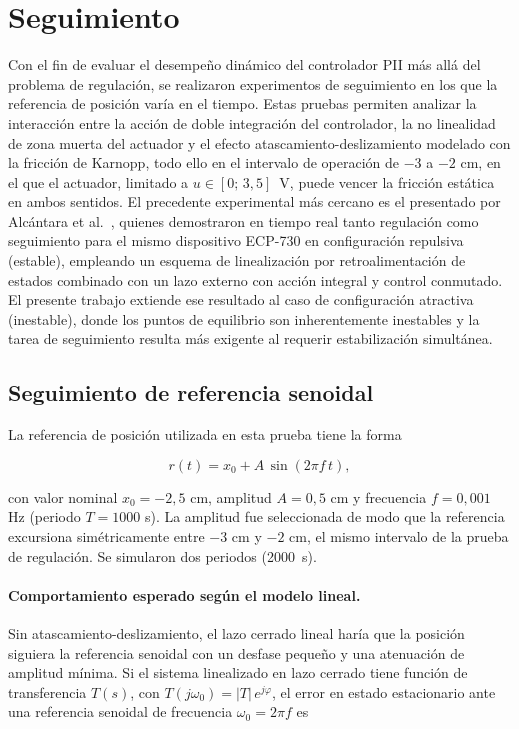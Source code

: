 \section{Seguimiento}

Con el fin de evaluar el desempeño dinámico del controlador PII más allá del problema de regulación,
se realizaron experimentos de seguimiento en los que la referencia de posición varía en el tiempo.
Estas pruebas permiten analizar la interacción entre la acción de doble integración del controlador,
la no linealidad de zona muerta del actuador y el efecto atascamiento-deslizamiento modelado con
la fricción de Karnopp, todo ello en el intervalo de operación de $-3$ a $-2$ cm, en el que el actuador, limitado a $u\in[0;\,3{,}5]$~V, puede vencer la fricción estática en ambos sentidos.
El precedente experimental más cercano es el presentado por Alcántara et al.\ \cite{alcantara},
quienes demostraron en tiempo real tanto regulación como seguimiento para el mismo dispositivo
ECP-730 en configuración repulsiva (estable), empleando un esquema de linealización por
retroalimentación de estados combinado con un lazo externo con acción integral y control conmutado.
El presente trabajo extiende ese resultado al caso de configuración atractiva (inestable),
donde los puntos de equilibrio son inherentemente inestables y la tarea de seguimiento resulta
más exigente al requerir estabilización simultánea.

\subsection{Seguimiento de referencia senoidal}

La referencia de posición utilizada en esta prueba tiene la forma

\begin{equation}
  r(t) = x_0 + A\,\sin(2\pi f\, t),
  \label{eq:ref_senoidal}
\end{equation}

con valor nominal $x_0 = -2{,}5$ cm, amplitud $A = 0{,}5$ cm y frecuencia $f = 0{,}001$ Hz
(periodo $T = 1000$ s).
La amplitud fue seleccionada de modo que la referencia excursiona simétricamente entre
$-3$ cm y $-2$ cm, el mismo intervalo de la prueba de regulación. Se simularon dos periodos (2000~s).

\paragraph{Comportamiento esperado según el modelo lineal.}
Sin atascamiento-deslizamiento, el lazo cerrado lineal haría que la posición siguiera la referencia senoidal con un desfase pequeño y una atenuación de amplitud mínima. Si el sistema linealizado en lazo cerrado tiene función de transferencia $T(s)$, con $T(j\omega_0)=|T|\,e^{j\varphi}$, el error en estado estacionario ante una referencia senoidal de frecuencia $\omega_0 = 2\pi f$ es

